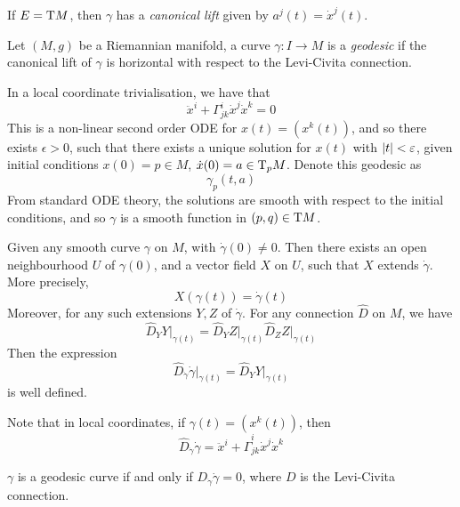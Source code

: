 \documentclass{article}
\begin{document}
\lec

If \(E = \mathrm{T} M\), then \(\gamma\) has a \emph{canonical lift} given by \(a^j(t) = \dot x^j(t)\).

\begin{definition}
    [geodesic] Let \((M, g)\) be a Riemannian manifold, a curve \(\gamma : I \to M\) is a \emph{geodesic} if the canonical lift of \(\gamma\) is horizontal with respect to the Levi-Civita connection.
\end{definition}

In a local coordinate trivialisation, we have that
\[\ddot x^i + \Gamma^i_{jk}\dot x^j\dot x^k = 0\]
This is a non-linear second order ODE for \(x(t) = (x^k(t))\), and so there exists \(\epsilon > 0\), such that there exists a unique solution for \(x(t)\) with \(\abs{t} < \varepsilon\), given initial conditions \(x(0) = p \in M\), \(\dot x(0) = a \in \mathrm{T}_p M\). Denote this geodesic as
\[\gamma_p(t, a)\]
From standard ODE theory, the solutions are smooth with respect to the initial conditions, and so \(\gamma\) is a smooth function in \((p, q) \in \mathrm{T} M\).

\begin{proposition}
    \label{prop:extend-local-vf}
    Given any smooth curve \(\gamma\) on \(M\), with \(\dot\gamma(0) \ne 0\). Then there exists an open neighbourhood \(U\) of \(\gamma(0)\), and a vector field \(X\) on \(U\), such that \(X\) extends \(\dot\gamma\). More precisely,
    \[X(\gamma(t)) = \dot\gamma(t)\] 
    Moreover, for any such extensions \(Y, Z\) of \(\dot \gamma\). For any connection \(\widehat D\) on \(M\), we have
    \[\widehat D_YY\vert_{\gamma(t)} = \widehat D_YZ\vert_{\gamma(t)} \widehat D_ZZ\vert_{\gamma(t)}\]
    Then the expression
    \[\widehat{D}_{\dot\gamma}\dot\gamma\vert_{\gamma(t)} = \widehat D_Y Y\vert_{\gamma(t)}\]
    is well defined.
\end{proposition}

Note that in local coordinates, if \(\gamma(t) = (x^k(t))\), then
\[\widehat D_{\dot\gamma}\dot\gamma = \ddot x^i + \widehat\Gamma^i_{jk}\dot x^j\dot x^k\]

\begin{corollary}
    \(\gamma\) is a geodesic curve if and only if \(D_{\dot\gamma}\dot\gamma = 0\), where \(D\) is the Levi-Civita connection.
\end{corollary}
\end{document}
